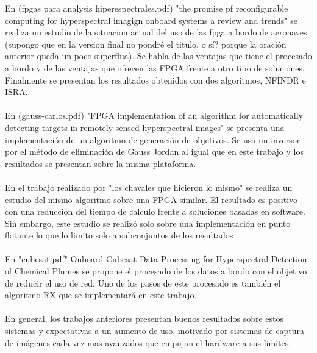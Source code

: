 En (fpgas para analysis hiperespectrales.pdf) "the promise pf reconfigurable computing for hyperspectral imagign onboard systems a review and trends" se realiza un estudio de la situacion actual del uso de las fpga a bordo de aeronaves (supongo que en la version final no pondré el titulo, o sí? porque la oración anterior queda un poco superflua). Se habla de las ventajas que tiene el procesado a bordo y de las ventajas que ofrecen las FPGA frente a otro tipo de soluciones. Finalmente se presentan los resultados obtenidos con dos algoritmos, NFINDR e ISRA.
\\
\\
En (gauss-carlos.pdf) "FPGA implementation of an algorithm for automatically detecting targets in remotely sensed hyperspectral images" se presenta una implementación de un algoritmo de generación de objetivos. Se usa un inversor por el método de eliminación de Gauss Jordan al igual que en este trabajo y los resultados se presentan sobre la misma plataforma.
\\
\\
En el trabajo realizado por "los chavales que hicieron lo mismo" se realiza un estudio del mismo algoritmo sobre una FPGA similar. El resultado es positivo con una reducción del tiempo de calculo frente a soluciones basadas en software. Sin embargo, este estudio se realizó solo sobre una implementación en punto flotante lo que lo limito solo a subconjuntos de los resultados
\\
\\
En "cubesat.pdf" Onboard Cubesat Data Processing for Hyperspectral Detection of Chemical Plumes se propone el procesado de los datos a bordo con el objetivo de reducir el uso de red. Uno de los pasos de este procesado es también el algoritmo RX que se implementará en este trabajo.
\\
\\
En general, los trabajos anteriores presentan buenos resultados sobre estos sistemas y expectativas a un aumento de uso, motivado por sistemas de captura de imágenes cada vez mas avanzados que empujan el hardware a sus limites.



